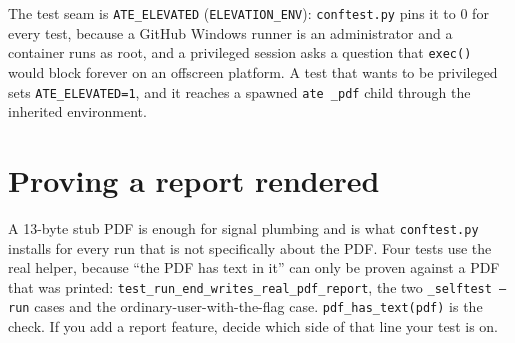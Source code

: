 The test seam is \texttt{ATE\_ELEVATED} (\texttt{ELEVATION\_ENV}): \texttt{conftest.py} pins it to 0 for
every test, because a GitHub Windows runner is an administrator and a container runs as root, and a
privileged session asks a question that \texttt{exec()} would block forever on an offscreen platform. A
test that wants to be privileged sets \texttt{ATE\_ELEVATED=1}, and it reaches a spawned \texttt{ate \_pdf}
child through the inherited environment.

\section{Proving a report rendered}

A 13-byte stub PDF is enough for signal plumbing and is what \texttt{conftest.py} installs for every
run that is not specifically about the PDF. Four tests use the real helper, because ``the PDF has text in
it'' can only be proven against a PDF that was printed: \texttt{test\_\allowbreak{}run\_\allowbreak{}end\_\allowbreak{}writes\_\allowbreak{}real\_\allowbreak{}pdf\_\allowbreak{}report},
the two \texttt{\_selftest --run} cases and the ordinary-user-with-the-flag case.
\texttt{pdf\_has\_text(pdf)} is the check. If you add a report feature, decide which side of that line
your test is on.

